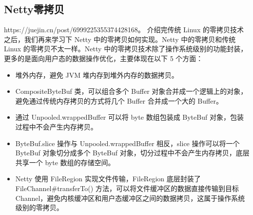 \documentclass[../../../interview-questions.tex]{subfiles}
\begin{document}
\subsection{Netty零拷贝}

https://juejin.cn/post/6999225355374428168。
介绍完传统 Linux 的零拷贝技术之后，我们再来学习下 Netty 中的零拷贝如何实现。Netty 中的零拷贝和传统 Linux 的零拷贝不太一样。Netty 中的零拷贝技术除了操作系统级别的功能封装，更多的是面向用户态的数据操作优化，主要体现在以下 5 个方面：

\begin{itemize}
    \item {堆外内存，避免 JVM 堆内存到堆外内存的数据拷贝。}
    \item {CompositeByteBuf 类，可以组合多个 Buffer 对象合并成一个逻辑上的对象，避免通过传统内存拷贝的方式将几个 Buffer 合并成一个大的 Buffer。}
    \item {通过 Unpooled.wrappedBuffer 可以将 byte 数组包装成 ByteBuf 对象，包装过程中不会产生内存拷贝。}
    \item {ByteBuf.slice 操作与 Unpooled.wrappedBuffer 相反，slice 操作可以将一个 ByteBuf 对象切分成多个 ByteBuf 对象，切分过程中不会产生内存拷贝，底层共享一个 byte 数组的存储空间。}
    \item {Netty 使用 FileRegion 实现文件传输，FileRegion 底层封装了 FileChannel\#transferTo() 方法，可以将文件缓冲区的数据直接传输到目标 Channel，避免内核缓冲区和用户态缓冲区之间的数据拷贝，这属于操作系统级别的零拷贝。}
\end{itemize}
\end{document}
